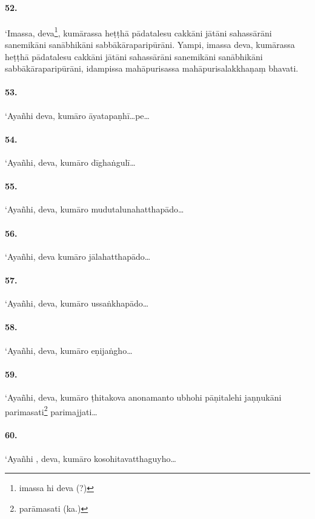 \paragraph{52.} ‘Imassa, deva\footnote{imassa hi deva (?)}, kumārassa heṭṭhā pādatalesu cakkāni jātāni sahassārāni sanemikāni sanābhikāni sabbākāraparipūrāni. Yampi, imassa deva, kumārassa heṭṭhā pādatalesu cakkāni jātāni sahassārāni sanemikāni sanābhikāni sabbākāraparipūrāni, idampissa mahāpurisassa mahāpurisalakkhaṇaṃ bhavati.

\paragraph{53.} ‘Ayañhi deva, kumāro āyatapaṇhī…pe…

\paragraph{54.} ‘Ayañhi, deva, kumāro dīghaṅgulī…

\paragraph{55.} ‘Ayañhi, deva, kumāro mudutalunahatthapādo…

\paragraph{56.} ‘Ayañhi, deva kumāro jālahatthapādo…

\paragraph{57.} ‘Ayañhi, deva, kumāro ussaṅkhapādo…

\paragraph{58.} ‘Ayañhi, deva, kumāro eṇijaṅgho…

\paragraph{59.} ‘Ayañhi, deva, kumāro ṭhitakova anonamanto ubhohi pāṇitalehi jaṇṇukāni parimasati\footnote{parāmasati (ka.)} parimajjati…

\paragraph{60.} ‘Ayañhi , deva, kumāro kosohitavatthaguyho…

